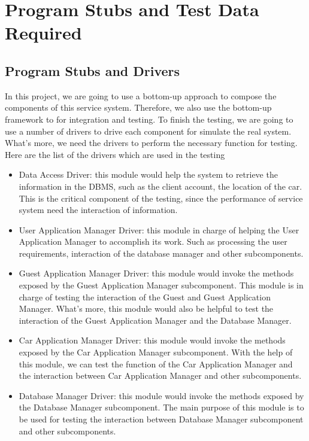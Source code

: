\documentclass{article}
\begin{document}
\newpage



\section{Program Stubs and Test Data Required}

\subsection{Program Stubs and Drivers}
In this project, we are going to use a bottom-up approach to compose the components of this service system. Therefore, we also use the bottom-up framework to for integration and testing.
\newline
To finish the testing, we are going to use a number of drivers to drive each component for simulate the real system. What's more, we need the drivers to perform the necessary function for testing. 
\newline
Here are the list of the drivers which are used in the testing
\begin{itemize}
	\item Data Access Driver: this module would help the system to retrieve the information in the DBMS, such as the client account, the location of the car. This is the critical component of the testing, since the performance of service system need the interaction of information. 
	\item User Application Manager Driver: this module in charge of helping the User Application Manager to accomplish its work. Such as processing the user requirements, interaction of the database manager and other subcomponents.
	\item Guest Application Manager Driver: this module would invoke the methods exposed by the Guest Application Manager subcomponent. This module is in charge of testing the interaction of the Guest and Guest Application Manager. What's more, this module would also be helpful to test the interaction of the Guest Application Manager and the Database Manager.
	\item Car Application Manager Driver: this module would invoke the methods exposed by the Car Application Manager subcomponent. With the help of this module, we can test the function of the Car Application Manager and the interaction between Car Application Manager and other subcomponents. 
	\item Database Manager Driver: this module would invoke the methods exposed by the Database Manager subcomponent. The main purpose of this module is to be used for testing the interaction between Database Manager subcomponent and other subcomponents.
\end{itemize}
\end{document}
